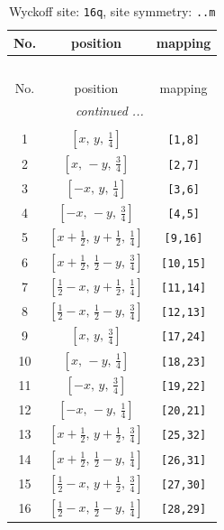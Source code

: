 \documentclass[fleqn,8pt]{jsarticle}
\begin{document}
\renewcommand{\arraystretch}{1.2}
\begin{longtable}{ccc}
\caption{Wyckoff site: {\tt 16q}, site symmetry: {\tt ..m}}
 \\
 \hline \hline
No. & position & mapping \\ \hline \endfirsthead

\multicolumn{2}{l}{\tablename\ \thetable{}} \\
 \hline \hline
No. & position & mapping \\ \hline \endhead

 \hline \hline
\multicolumn{2}{r}{\footnotesize\it continued ...} \\ \endfoot

 \hline \hline
\multicolumn{2}{r}{} \\ \endlastfoot

1 & $\left[ x,\, y,\, \frac{1}{4} \right]$ & {\tt [1,8]} \\ \hline
2 & $\left[ x,\, - y,\, \frac{3}{4} \right]$ & {\tt [2,7]} \\ \hline
3 & $\left[ - x,\, y,\, \frac{1}{4} \right]$ & {\tt [3,6]} \\ \hline
4 & $\left[ - x,\, - y,\, \frac{3}{4} \right]$ & {\tt [4,5]} \\ \hline
5 & $\left[ x + \frac{1}{2},\, y + \frac{1}{2},\, \frac{1}{4} \right]$ & {\tt [9,16]} \\ \hline
6 & $\left[ x + \frac{1}{2},\, \frac{1}{2} - y,\, \frac{3}{4} \right]$ & {\tt [10,15]} \\ \hline
7 & $\left[ \frac{1}{2} - x,\, y + \frac{1}{2},\, \frac{1}{4} \right]$ & {\tt [11,14]} \\ \hline
8 & $\left[ \frac{1}{2} - x,\, \frac{1}{2} - y,\, \frac{3}{4} \right]$ & {\tt [12,13]} \\ \hline
9 & $\left[ x,\, y,\, \frac{3}{4} \right]$ & {\tt [17,24]} \\ \hline
10 & $\left[ x,\, - y,\, \frac{1}{4} \right]$ & {\tt [18,23]} \\ \hline
11 & $\left[ - x,\, y,\, \frac{3}{4} \right]$ & {\tt [19,22]} \\ \hline
12 & $\left[ - x,\, - y,\, \frac{1}{4} \right]$ & {\tt [20,21]} \\ \hline
13 & $\left[ x + \frac{1}{2},\, y + \frac{1}{2},\, \frac{3}{4} \right]$ & {\tt [25,32]} \\ \hline
14 & $\left[ x + \frac{1}{2},\, \frac{1}{2} - y,\, \frac{1}{4} \right]$ & {\tt [26,31]} \\ \hline
15 & $\left[ \frac{1}{2} - x,\, y + \frac{1}{2},\, \frac{3}{4} \right]$ & {\tt [27,30]} \\ \hline
16 & $\left[ \frac{1}{2} - x,\, \frac{1}{2} - y,\, \frac{1}{4} \right]$ & {\tt [28,29]} \\
\end{longtable}
\end{document}
